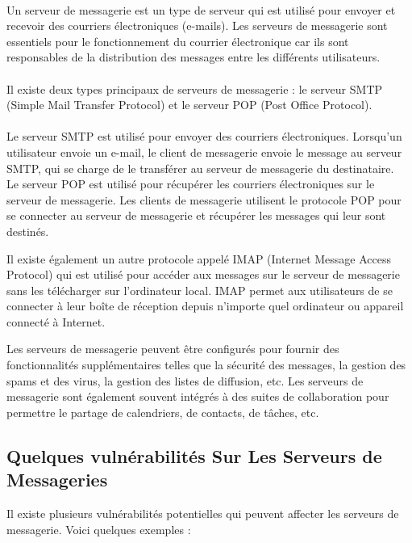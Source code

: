 \paragraph{ }

Un serveur de messagerie est un type de serveur qui est utilisé pour envoyer et recevoir des courriers électroniques (e-mails). Les serveurs de messagerie sont essentiels pour le fonctionnement du courrier électronique car ils sont responsables de la distribution des messages entre les différents utilisateurs.\\
\paragraph{ }
Il existe deux types principaux de serveurs de messagerie : le serveur SMTP (Simple Mail Transfer Protocol) et le serveur POP (Post Office Protocol).\\
\paragraph{ }
Le serveur SMTP est utilisé pour envoyer des courriers électroniques. Lorsqu'un utilisateur envoie un e-mail, le client de messagerie envoie le message au serveur SMTP, qui se charge de le transférer au serveur de messagerie du destinataire.\\

Le serveur POP est utilisé pour récupérer les courriers électroniques sur le serveur de messagerie. Les clients de messagerie utilisent le protocole POP pour se connecter au serveur de messagerie et récupérer les messages qui leur sont destinés.

Il existe également un autre protocole appelé IMAP (Internet Message Access Protocol) qui est utilisé pour accéder aux messages sur le serveur de messagerie sans les télécharger sur l'ordinateur local. IMAP permet aux utilisateurs de se connecter à leur boîte de réception depuis n'importe quel ordinateur ou appareil connecté à Internet.

Les serveurs de messagerie peuvent être configurés pour fournir des fonctionnalités supplémentaires telles que la sécurité des messages, la gestion des spams et des virus, la gestion des listes de diffusion, etc. Les serveurs de messagerie sont également souvent intégrés à des suites de collaboration pour permettre le partage de calendriers, de contacts, de tâches, etc.
\subsection{Quelques vulnérabilités Sur Les Serveurs de Messageries }
Il existe plusieurs vulnérabilités potentielles qui peuvent affecter les serveurs de messagerie. Voici quelques exemples :
